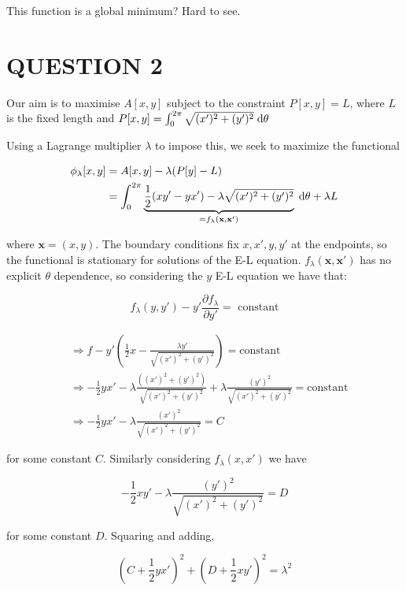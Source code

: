 \documentclass[a4paper]{article}
\begin{document}
This function is a global minimum? Hard to see. 

\section{QUESTION 2}


Our aim is to maximise $ A[x,y] $ subject to the constraint $ P[x,y] = L $, where $ L $ is the fixed length and $ P[x,y] = \int_{0}^{2\pi} \sqrt{  (x')^{2}  + (y')^{2} } \; \mathrm{d} \theta  $

Using a Lagrange multiplier $ \lambda $ to impose this, we seek to maximize the functional

\begin{align*}
\phi_{\lambda}[x,y]  & = A[x,y] - \lambda ( P[y] - L )  \\
& = \int_{0}^{2 \pi} \underbrace{\frac{1}{2} ( xy' - yx' ) - \lambda \sqrt{  (x')^{2}  + (y')^{2} }}_{=f_{\lambda}(\mathbf{x},\mathbf{x}')} \; \mathrm{d} \theta + \lambda L
\end{align*}

where $ \mathbf{x} = (x,y) $. The boundary conditions fix $ x, x',y,y' $ at the endpoints, so the functional is stationary for solutions of the E-L equation.  $ f_{\lambda}(\mathbf{x},\mathbf{x}') $ has no explicit $ \theta $ dependence, so considering the $ y $ E-L equation we have that:

\[ f_{\lambda}(y,y') - y' \frac{\partial f_{\lambda} }{\partial y'} = \text{ constant}  \]

\begin{align*}
& \Rightarrow f - y' \left(  \frac{1}{2} x - \frac{\lambda y'}{\sqrt{  (x')^{2}  + (y')^{2} }} \right) = \text{constant} \\
& \Rightarrow  -\frac{1}{2} yx' - \lambda \frac{ ( (x')^{2}  + (y')^{2} )}{\sqrt{  (x')^{2}  + (y')^{2} }} + \lambda \frac{(y')^{2}}{\sqrt{  (x')^{2}  + (y')^{2} }} = \text{constant} \\
& \Rightarrow - \frac{1}{2} y x' - \lambda \frac{(x')^{2}}{\sqrt{  (x')^{2}  + (y')^{2} }} = C
\end{align*}

for some constant $ C $. Similarly considering $ f_{\lambda}(x,x') $ we have

\[ - \frac{1}{2} x y' - \lambda \frac{(y')^{2}}{\sqrt{  (x')^{2}  + (y')^{2} }} = D \]

for some constant $ D $. Squaring and adding,

\[ (C + \frac{1}{2} y x')^{2} + (D + \frac{1}{2} x y')^{2} = \lambda^{2} \]
\end{document}
